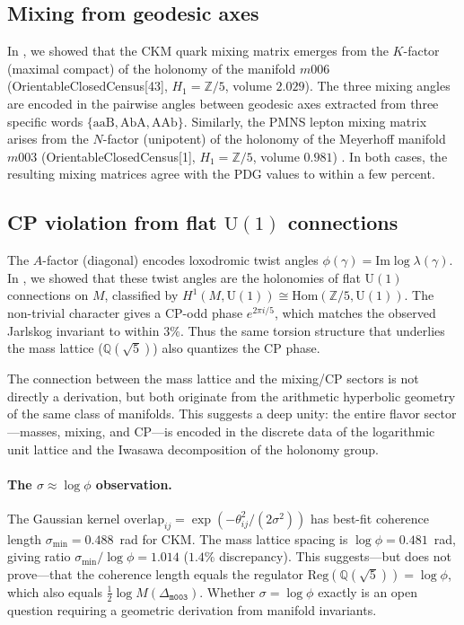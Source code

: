 ﻿\documentclass[12pt]{article}
\theoremstyle{definition}
\begin{document}
\subsection{Mixing from geodesic axes}
In \cite{Gentry:CKM}, we showed that the CKM quark mixing matrix emerges from the $K$-factor (maximal compact) of the holonomy of the manifold $m006$ (OrientableClosedCensus[43], $H_1=\mathbb{Z}/5$, volume $2.029$). The three mixing angles are encoded in the pairwise angles between geodesic axes extracted from three specific words $\{\mathrm{aaB},\mathrm{AbA},\mathrm{AAb}\}$. Similarly, the PMNS lepton mixing matrix arises from the $N$-factor (unipotent) of the holonomy of the Meyerhoff manifold $m003$ (OrientableClosedCensus[1], $H_1=\mathbb{Z}/5$, volume $0.981$) \cite{Gentry:PMNS}. In both cases, the resulting mixing matrices agree with the PDG values to within a few percent.

\subsection{CP violation from flat $\mathrm{U}(1)$ connections}
The $A$-factor (diagonal) encodes loxodromic twist angles $\phi(\gamma)=\mathrm{Im}\log\lambda(\gamma)$. In \cite{Gentry:CP}, we showed that these twist angles are the holonomies of flat $\mathrm{U}(1)$ connections on $M$, classified by $H^1(M,\mathrm{U}(1))\cong\mathrm{Hom}(\mathbb{Z}/5,\mathrm{U}(1))$. The non-trivial character gives a CP-odd phase $e^{2\pi i/5}$, which matches the observed Jarlskog invariant to within $3\%$. Thus the same torsion structure that underlies the mass lattice ($\mathbb{Q}(\sqrt5)$) also quantizes the CP phase.

The connection between the mass lattice and the mixing/CP sectors is not directly a derivation, but both originate from the arithmetic hyperbolic geometry of the same class of manifolds. This suggests a deep unity: the entire flavor sector---masses, mixing, and CP---is encoded in the discrete data of the logarithmic unit lattice and the Iwasawa decomposition of the holonomy group.




\paragraph{The $\sigma\approx\log\phi$ observation.}
The Gaussian kernel
$\mathrm{overlap}_{ij}=\exp(-\theta_{ij}^2/(2\sigma^2))$
has best-fit coherence length $\sigma_{\min}=0.488$~rad for CKM.
The mass lattice spacing is $\log\phi=0.481$~rad, giving ratio
$\sigma_{\min}/\log\phi=1.014$ ($1.4\%$ discrepancy).
This suggests---but does not prove---that the coherence length
equals the regulator $\mathrm{Reg}(\mathbb{Q}(\sqrt5))=\log\phi$,
which also equals $\tfrac{1}{2}\log M(\Delta_{\texttt{m003}})$.
Whether $\sigma=\log\phi$ exactly is an open question requiring
a geometric derivation from manifold invariants.
\end{document}
